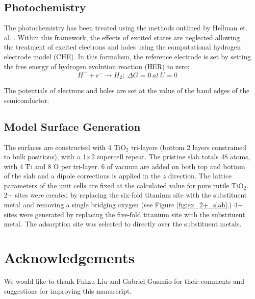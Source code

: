 \subsection{Photochemistry}
\label{sec:PEC_methods}
The photochemistry has been treated using the methods outlined by Hellman et. al. \cite{Hellman2017}. Within this framework, the effects of excited states are neglected allowing the treatment of excited electrons and holes using the computational hydrogen electrode model (CHE). In this formalism, the reference electrode is set by setting the free energy of hydrogen evolution reaction (HER) to zero:
\begin{equation}
    H^+ + e^- \rightarrow H_2;\; \Delta G = 0\:at\: U = 0
\end{equation}

The potentials of electrons and holes are set at the value of the band edges of the semiconductor.

\subsection{Model Surface Generation}
 The surfaces are constructed with 4 TiO$_2$ tri-layers (bottom 2 layers constrained to bulk positions), with a 1$\times$2 supercell repeat. The pristine slab totals 48 atoms, with 4 Ti and 8 O per tri-layer. 6 \A{} of vacuum are added on both top and bottom of the slab and a dipole corrections is applied in the $z$ direction\cite{Dipole_paper}. The lattice parameters of the unit cells are fixed at the calculated value for pure rutile TiO$_2$. 2+ sites were created by replacing the six-fold titanium site with the substituent metal and removing a single bridging oxygen (see Figure \ref{fig:ex_2+_slab}.) 4+ sites were generated by replacing the five-fold titanium site with the substituent metal. The adsorption site was selected to directly over the substituent metals. 

\section{Acknowledgements}
We would like to thank Fuhzu Liu and Gabriel Gusm\~ao for their comments and suggestions for improving this manuscript.



\appendix



